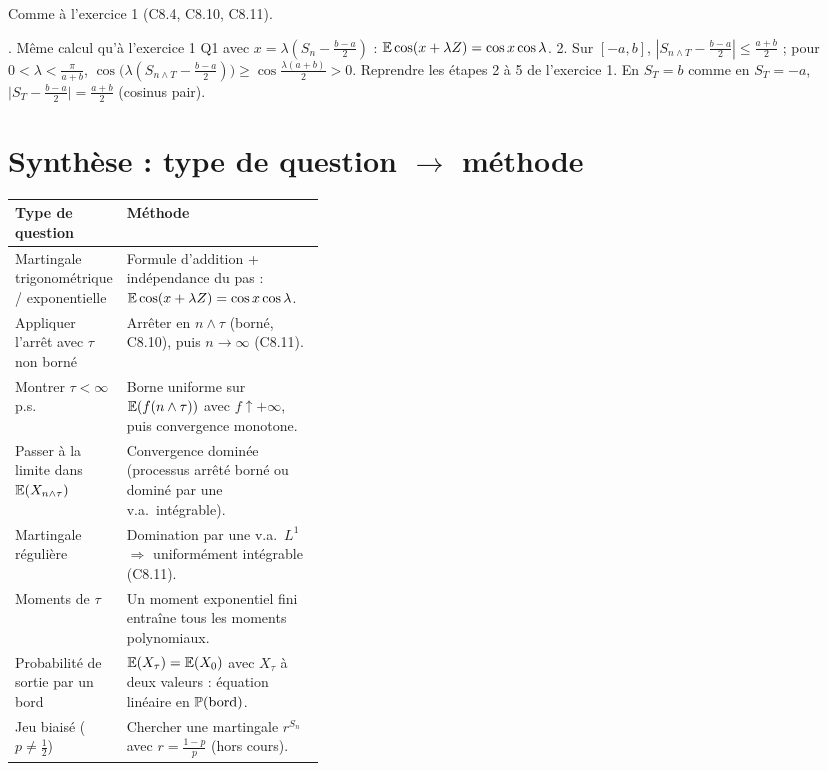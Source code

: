 \documentclass[11pt,a4paper]{article}
\begin{document}
\begin{exo}
\outils Comme à l'exercice 1 (C8.4, C8.10, C8.11).

. Même calcul qu'à l'exercice 1 Q1 avec $x=\lambda(S_n-\frac{b-a}2)$ : $\mathbb{E}\cos(x+\lambda Z)=\cos x\cos\lambda$.
2. Sur $[-a,b]$, $|S_{n\wedge T}-\frac{b-a}2|\le\frac{a+b}2$ ; pour $0<\lambda<\frac\pi{a+b}$, $\cos\bigl(\lambda(S_{n\wedge T}-\frac{b-a}2)\bigr)\ge\cos\frac{\lambda(a+b)}2>0$.
Reprendre les étapes 2 à 5 de l'exercice 1. En $S_T=b$ comme en $S_T=-a$, $\bigl|S_T-\frac{b-a}2\bigr|=\frac{a+b}2$ (cosinus pair).
\end{exo}

\section*{Synthèse : type de question $\to$ méthode}
\renewcommand{\arraystretch}{1.3}
\begin{tabularx}{\linewidth}{@{}>{\raggedright\arraybackslash}p{0.36\linewidth}X@{}}
\toprule
Type de question & Méthode\\\midrule
Martingale trigonométrique / exponentielle & Formule d'addition + indépendance du pas : $\mathbb{E}\cos(x+\lambda Z)=\cos x\cos\lambda$.\\
Appliquer l'arrêt avec $\tau$ non borné & Arrêter en $n\wedge\tau$ (borné, C8.10), puis $n\to\infty$ (C8.11).\\
Montrer $\tau<\infty$ p.s. & Borne uniforme sur $\mathbb{E}(f(n\wedge\tau))$ avec $f\uparrow+\infty$, puis convergence monotone.\\
Passer à la limite dans $\mathbb{E}(X_{n\wedge\tau})$ & Convergence dominée (processus arrêté borné ou dominé par une v.a.\ intégrable).\\
Martingale régulière & Domination par une v.a.\ $L^1$ $\Rightarrow$ uniformément intégrable (C8.11).\\
Moments de $\tau$ & Un moment exponentiel fini entraîne tous les moments polynomiaux.\\
Probabilité de sortie par un bord & $\mathbb{E}(X_\tau)=\mathbb{E}(X_0)$ avec $X_\tau$ à deux valeurs : équation linéaire en $\mathbb{P}(\text{bord})$.\\
Jeu biaisé ($p\neq\frac12$) & Chercher une martingale $r^{S_n}$ avec $r=\frac{1-p}p$ (hors cours).\\\bottomrule
\end{tabularx}
\end{document}

